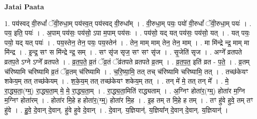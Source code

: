 \documentclass[17pt]{extarticle}
\begin{document}
\textbf{Jatai Paata} \newline

1. पय॑स्वद् वी॒रुधां᳚ ॅवी॒रुधा॒म् पय॑स्व॒त् पय॑स्वद् वी॒रुधा᳚म् । . वी॒रुधा॒म् पयः॒ पयो॑ वी॒रुधां᳚ ॅवी॒रुधा॒म् पयः॑ । . पय॒ इति॒ पयः॑ । . अ॒पाम् पय॑सः॒ पय॑सो॒ ऽपा म॒पाम् पय॑सः । . पय॑सो॒ यद् यत् पय॑सः॒ पय॑सो॒ यत् । . यत् पयः॒ पयो॒ यद् यत् पयः॑ । . पय॒स्तेन॒ तेन॒ पयः॒ पय॒स्तेन॑ । . तेन॒ माम् माम् तेन॒ तेन॒ माम् । . मा मि॑न्द्रे न्द्र॒ माम् मा मि॑न्द्र । . इ॒न्द्र॒ सꣳ स मि॑न्द्रे न्द्र॒ सम् । . सꣳ सृ॑ज सृज॒ सꣳ सꣳ सृ॑ज । . सृ॒जेति॑ सृज । . अग्ने᳚ व्रतपते व्रतप॒ते ऽग्ने ऽग्ने᳚ व्रतपते । . व्र॒त॒प॒ते॒ व्र॒तं ॅव्र॒तं ॅव्र॑तपते व्रतपते व्र॒तम् । . व्र॒त॒प॒त॒ इति॑ व्रत - प॒ते॒ । . व्र॒तम् च॑रिष्यामि चरिष्यामि व्र॒तं ॅव्र॒तम् च॑रिष्यामि । . च॒रि॒ष्या॒मि॒ तत् तच् च॑रिष्यामि चरिष्यामि॒ तत् । . तच्छ॑केयꣳ शकेय॒म् तत् तच्छ॑केयम् । . श॒के॒य॒म् तत् तच्छ॑केयꣳ शकेय॒म् तत् । . तन् मे॑ मे॒ तत् तन् मे᳚ । . मे॒ रा॒द्ध्य॒ता॒(ग्म्॒) रा॒द्ध्य॒ता॒म् मे॒ मे॒ रा॒द्ध्य॒ता॒म् । . रा॒द्ध्य॒ता॒मिति॑ राद्ध्यताम् । . अ॒ग्निꣳ होता॑र॒(ग्म्॒) होता॑र म॒ग्नि म॒ग्निꣳ होता॑रम् । . होता॑र मि॒हे ह होता॑र॒(ग्म्॒) होता॑र मि॒ह । . इ॒ह तम् त मि॒हे ह तम् । . तꣳ हु॑वे हुवे॒ तम् तꣳ हु॑वे । . हु॒वे॒ दे॒वान् दे॒वान्. हु॑वे हुवे दे॒वान् । . दे॒वान्. य॒ज्ञियान्॑. य॒ज्ञिया᳚न् दे॒वान् दे॒वान्. य॒ज्ञियान्॑ । \newline
\end{document}
